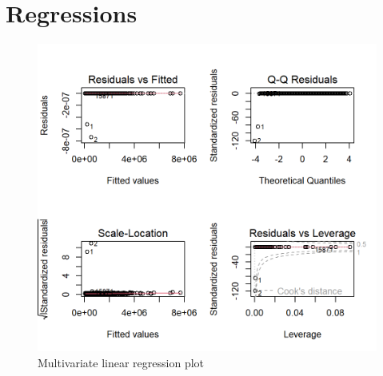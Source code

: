 \documentclass[a4paper, 9pt]{article}
\begin{document}
\section{Regressions}
\begin{figure}[H]
\includegraphics[scale=0.9]{MLR}
\centering
\caption{Multivariate linear regression plot}
\label{fig:MLR}
\end{figure}
\end{document}
